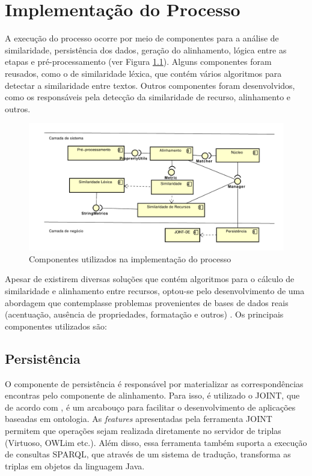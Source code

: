 \chapter{Implementação do Processo}
\label{cap:componentes}
A execução do processo ocorre por meio de componentes para a análise de similaridade, persistência dos dados, geração do alinhamento, lógica entre as etapas e pré-processamento (ver Figura \ref{fig:componentes}). Alguns componentes foram reusados, como o de similaridade léxica, que contém vários algoritmos para detectar a similaridade entre textos. Outros componentes foram desenvolvidos, como os responsáveis pela detecção da similaridade de recurso, alinhamento e outros.

\begin{figure}[!ht]
	\centering
	\includegraphics[width=1\textwidth]{./imagens/componentes.pdf}
    \caption{Componentes utilizados na implementação do processo}
	\label{fig:componentes}
\end{figure}

Apesar de existirem diversas soluções que contém algoritmos para o cálculo de similaridade e alinhamento entre recursos, optou-se pelo desenvolvimento de uma abordagem que contemplasse problemas provenientes de bases de dados reais (acentuação, ausência de propriedades, formatação e outros) \cite{castano2011ontology,ferrara2008towards}.
Os principais componentes utilizados são:

\section{Persistência}

O componente de persistência é responsável por materializar as correspondências encontras pelo componente de alinhamento. Para isso, é utilizado o JOINT, que de acordo com , é um arcabouço para facilitar o desenvolvimento de aplicações baseadas em ontologia. As \textit{features} apresentadas pela ferramenta JOINT permitem que operações sejam realizada diretamente no servidor de triplas (Virtuoso, OWLim etc.). Além disso, essa ferramenta também suporta a execução de consultas SPARQL, que através de um sistema de tradução, transforma as triplas em objetos da linguagem Java.

